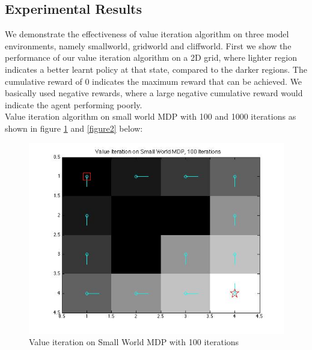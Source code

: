 \documentclass{article}\usepackage[]{graphicx}\usepackage[]{color}
\let\Oldsubsection\subsection
\renewcommand{\subsection}{\FloatBarrier\Oldsubsection}
\theoremstyle{plain}
\begin{document}
\subsection{Experimental Results}
\noindent
We demonstrate the effectiveness of value iteration algorithm on three model environments, namely smallworld, gridworld and cliffworld. First we show the performance of our value iteration algorithm on a 2D grid, where lighter region indicates a better learnt policy at that state, compared to the darker regions. The cumulative reward of 0 indicates the maximum reward that can be achieved. We basically used negative rewards, where a large negative cumulative reward would indicate the agent performing poorly.\\

\noindent
Value iteration algorithm on small world MDP with 100 and 1000 iterations as shown in figure \ref{figure1} and \ref{figure2} below:

 



\begin{figure}[h!]
  \includegraphics[scale=0.5]{Value100.jpg}
  \caption{Value iteration on Small World MDP with 100 iterations}
  \label{figure1}
\end{figure}
\end{document}
